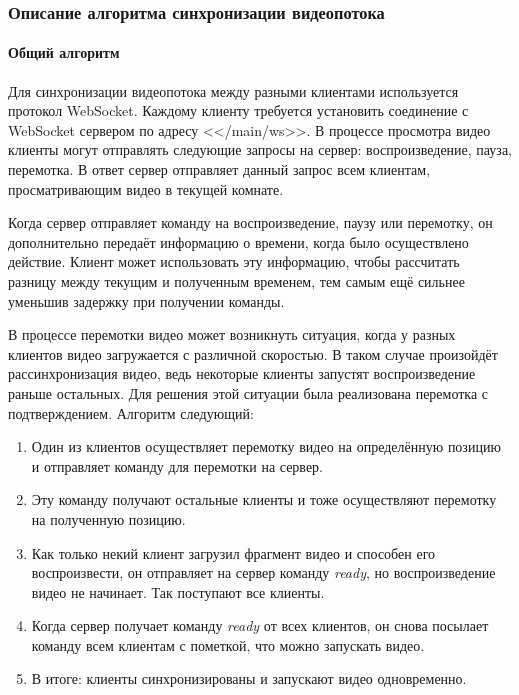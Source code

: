 \documentclass{../includes/TechDoc}
\begin{document}
    \subsubsection{Описание алгоритма синхронизации видеопотока}

    \paragraph{Общий алгоритм}

    Для синхронизации видеопотока между разными клиентами используется протокол WebSocket.
    Каждому клиенту требуется установить соединение с WebSocket сервером по адресу <</main/ws>>.
    В процессе просмотра видео клиенты могут отправлять следующие запросы на сервер: воспроизведение, пауза, перемотка.
    В ответ сервер отправляет данный запрос всем клиентам, просматривающим видео в текущей комнате.

    Когда сервер отправляет команду на воспроизведение, паузу или перемотку, он дополнительно передаёт информацию о времени, когда было осуществлено действие.
    Клиент может использовать эту информацию, чтобы рассчитать разницу между текущим и полученным временем, тем самым ещё сильнее уменьшив задержку при получении команды.

    В процессе перемотки видео может возникнуть ситуация, когда у разных клиентов видео загружается с различной скоростью.
    В таком случае произойдёт рассинхронизация видео, ведь некоторые клиенты запустят воспроизведение раньше остальных.
    Для решения этой ситуации была реализована перемотка с подтверждением. Алгоритм следующий:

    \begin{enumerate}
        \item Один из клиентов осуществляет перемотку видео на определённую позицию и отправляет команду для перемотки на сервер.
        \item Эту команду получают остальные клиенты и тоже осуществляют перемотку на полученную позицию.
        \item Как только некий клиент загрузил фрагмент видео и способен его воспроизвести, он отправляет на сервер команду \emph{ready}, но воспроизведение видео не начинает. Так поступают все клиенты.
        \item Когда сервер получает команду \emph{ready} от всех клиентов, он снова посылает команду всем клиентам с пометкой, что можно запускать видео.
        \item В итоге: клиенты синхронизированы и запускают видео одновременно.
    \end{enumerate}
\end{document}
